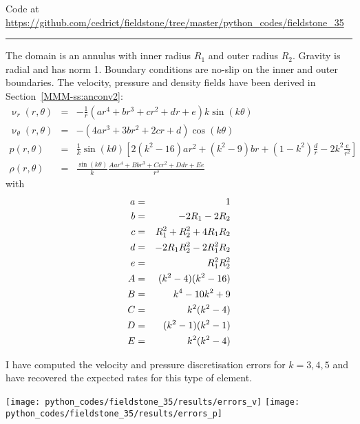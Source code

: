 

\begin{center}
Code at \url{https://github.com/cedrict/fieldstone/tree/master/python_codes/fieldstone_35}
\end{center}

\par\noindent\rule{\textwidth}{0.4pt}

The domain is an annulus with inner radius $R_1$ and outer radius $R_2$. Gravity is radial 
and has norm 1. 
Boundary conditions are no-slip on the inner and outer boundaries.
The velocity, pressure and density fields have been derived in Section~\ref{MMM-ss:anconv2}:
\begin{eqnarray}
\upnu_r (r,\theta)&=& -\frac{1}{r} (
{ ar^4}
+{ br^3}
+{c r^2}
+ {dr}
+{e}
)k\sin(k\theta)\\
\upnu_\theta(r,\theta)&=& -(4ar^3+3br^2 +2cr + d ) \cos(k\theta) \\
p(r,\theta) &= &
\frac{1}{k}\sin(k\theta) 
\left[
2(k^2-16)ar^2
+(k^2-9)br
+(1-k^2)\frac{d}{r}
-2k^2\frac{e}{r^2}
\right] \\
\rho(r,\theta)&=&\frac{\sin(k\theta)}{k}
\frac{
A{ ar^4}+
B{ br^3}+
C{c r^2} +
D {dr}+
E{e}
}{r^3}
\end{eqnarray}
with
\begin{eqnarray}
a &=& 1  \nonumber\\
b &=& -2R_1-2R_2 \nonumber\\
c &=& R_1^2+R_2^2+4R_1R_2 \nonumber\\
d &=& -2R_1R_2^2-2R_1^2R_2 \nonumber\\
e &=& R_1^2R_2^2 \nonumber\\
A &=& (k^2-4)(k^2-16)\nonumber \\
B &=& k^4-10k^2+9\nonumber    \\
C &=& k^2(k^2-4)  \nonumber    \\
D &=& (k^2-1)(k^2-1) \nonumber     \\
E &=& k^2(k^2-4) \nonumber
\end{eqnarray}

I have computed the velocity and pressure discretisation errors for $k=3,4,5$ and 
have recovered the expected rates for this type of element.

\begin{center}
\texttt{[image: python\_codes/fieldstone\_35/results/errors\_v]}
\texttt{[image: python\_codes/fieldstone\_35/results/errors\_p]}
\end{center}

